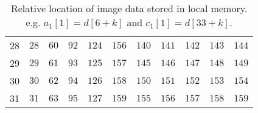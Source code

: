 \begin{table}[H]
\begin{tabular}{r|rrrrr|rrrrr}
        28 & $28$     & $60$     & $92$     & $124$    & $156$    & $140$    & $141$    & $142$    & $143$    & $144$    \\
        29 & $29$     & $61$     & $93$     & $125$    & $157$    & $145$    & $146$    & $147$    & $148$    & $149$    \\
        30 & $30$     & $62$     & $94$     & $126$    & $158$    & $150$    & $151$    & $152$    & $153$    & $154$    \\
        31 & $31$     & $63$     & $95$     & $127$    & $159$    & $155$    & $156$    & $157$    & $158$    & $159$
    \end{tabular}
    \caption{Relative location of image data stored in local memory. \newline e.g. \quad $a_1[1]=d[6+k]$ and  $c_1[1]=d[33+k]$.}
    \label{table:memory_index}
\end{table}